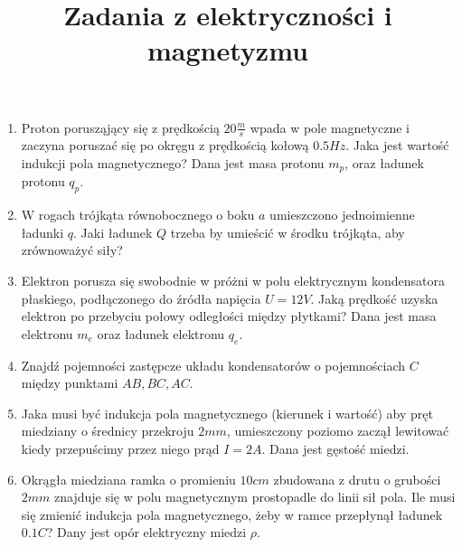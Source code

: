 \documentclass{../notatki}
\title{Zadania z elektryczności i magnetyzmu}
\begin{document}
\begin{enumerate}
  \item Proton porusząjący się z prędkością $20 \frac{m}{s}$ wpada w
    pole magnetyczne i zaczyna poruszać się po okręgu z prędkością
    kołową $0.5 Hz$. Jaka jest wartość indukcji pola magnetycznego?
    Dana jest masa protonu $m_p$, oraz ładunek protonu $q_p$.
  \item W rogach trójkąta równobocznego o boku $a$ umieszczono
    jednoimienne ładunki $q$. Jaki ładunek $Q$ trzeba by umieścić w
    środku trójkąta, aby zrównoważyć siły?
  \item Elektron porusza się swobodnie w próżni w polu elektrycznym
    kondensatora płaskiego, podłączonego do źródła napięcia $U =
    12V$. Jaką prędkość uzyska elektron po przebyciu połowy
    odległości między płytkami? Dana jest masa elektronu $m_e$ oraz
    ładunek elektronu $q_e$.
  \item Znajdź pojemności zastępcze układu kondensatorów o pojemnościach $C$
    między punktami $AB, BC, AC$.
    \begin{figure}[h]
      \centering
    \end{figure}

  \item Jaka musi być indukcja pola magnetycznego (kierunek i wartość) aby pręt
    miedziany o średnicy przekroju $2 mm$, umieszczony poziomo zaczął lewitować
    kiedy przepuścimy przez niego prąd $I = 2A$. Dana jest gęstość
    miedzi.
  \item Okrągła miedziana ramka o promieniu $10 cm$ zbudowana z drutu o grubości
    $2 mm$ znajduje się w polu magnetycznym prostopadle do linii sił
    pola. Ile musi
    się zmienić indukcja pola magnetycznego, żeby w ramce przepłynął
    ładunek $0.1 C$? Dany jest opór elektryczny miedzi $\rho$.
\end{enumerate}
\end{document}
